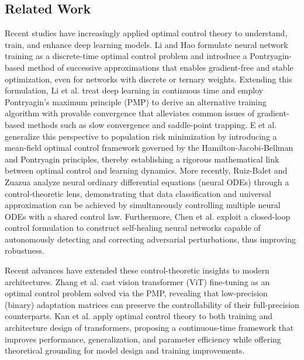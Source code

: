 \documentclass[11pt]{amsart}
\numberwithin{equation}{section} %
\theoremstyle{remark}
\begin{document}
\subsection*{Related Work}

Recent studies have increasingly applied optimal control theory to understand, train, and enhance deep learning models. Li and Hao \cite{li2018optimal} formulate neural network training as a discrete-time optimal control problem and introduce a Pontryagin-based method of successive approximations that enables gradient-free and stable optimization, even for networks with discrete or ternary weights. Extending this formulation, Li et al. \cite{li2018maximum} treat deep learning in continuous time and employ Pontryagin's maximum principle (PMP) to derive an alternative training algorithm with provable convergence that alleviates common issues of gradient-based methods such as slow convergence and saddle-point trapping. E et al. \cite{han2019mean} generalize this perspective to population risk minimization by introducing a mean-field optimal control framework governed by the Hamilton-Jacobi-Bellman and Pontryagin principles, thereby establishing a rigorous mathematical link between optimal control and learning dynamics. More recently, Ruiz-Balet and Zuazua \cite{ruiz2023neural} analyze neural ordinary differential equations (neural ODEs) through a control-theoretic lens, demonstrating that data classification and universal approximation can be achieved by simultaneously controlling multiple neural ODEs with a shared control law. Furthermore, Chen et al. \cite{chen2022self} exploit a closed-loop control formulation to construct self-healing neural networks capable of autonomously detecting and correcting adversarial perturbations, thus improving robustness.

Recent advances have extended these control-theoretic insights to modern architectures. Zhang et al. \cite{zhang2024optimal} cast vision transformer (ViT) fine-tuning as an optimal control problem solved via the PMP, revealing that low-precision (binary) adaptation matrices can preserve the controllability of their full-precision counterparts. Kan et al. \cite{kan2025optimal} apply optimal control theory to both training and architecture design of transformers, proposing a continuous-time framework that improves performance, generalization, and parameter efficiency while offering theoretical grounding for model design and training improvements.
\end{document}

